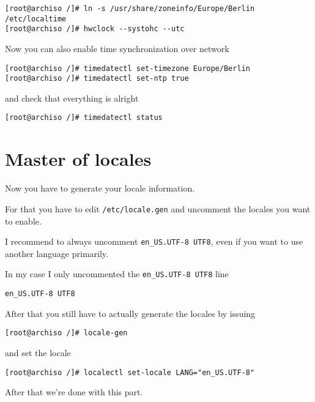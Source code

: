 \documentclass[9pt]{report}
\newenvironment{NOTE}
{\begin{tcolorbox}[colback=admonitionBG,coltitle=draculaFG,colframe=draculaBlue,colbacktitle=draculaBlue,title=NOTE]}
{\end{tcolorbox}}
\begin{document}
\begin{verbatim}
[root@archiso /]# ln -s /usr/share/zoneinfo/Europe/Berlin /etc/localtime
[root@archiso /]# hwclock --systohc --utc
\end{verbatim}

Now you can also enable time synchronization over network


\begin{verbatim}
[root@archiso /]# timedatectl set-timezone Europe/Berlin
[root@archiso /]# timedatectl set-ntp true
\end{verbatim}

and check that everything is alright


\begin{verbatim}
[root@archiso /]# timedatectl status
\end{verbatim}


\newpage

\hypertarget{x-master-of-locales}{\section{Master of locales}}
Now you have to generate your locale information.


For that you have to edit \texttt{/etc/locale.gen} and uncomment the locales you want to enable.


\begin{NOTE}
    I recommend to always uncomment \texttt{en\_US.UTF-8 UTF8}, even if you want to use another language primarily.

\end{NOTE}
In my case I only uncommented the \texttt{en\_US.UTF-8 UTF8} line


\begin{verbatim}
en_US.UTF-8 UTF8
\end{verbatim}

After that you still have to actually generate the locales by issuing


\begin{verbatim}
[root@archiso /]# locale-gen
\end{verbatim}

and set the locale


\begin{verbatim}
[root@archiso /]# localectl set-locale LANG="en_US.UTF-8"
\end{verbatim}

After that we’re done with this part.
\end{document}
